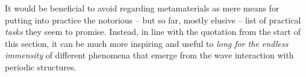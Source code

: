 It would be beneficial to avoid regarding metamaterials as mere means for putting into practice the notorious -- but so far, mostly elusive -- list of practical \textit{tasks} they seem to promise. Instead, in line with the quotation from the start of this section, it can be much more inspiring and useful to \textit{long for the endless immensity} of different phenomena that emerge from the wave interaction with periodic structures.

\newpage
